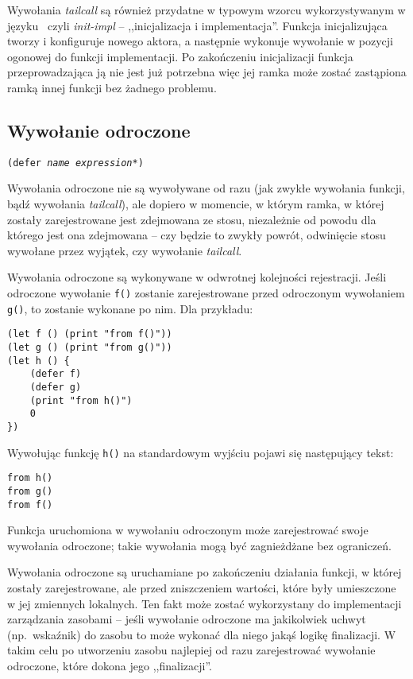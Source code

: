 Wywołania \emph{tailcall} są również przydatne w typowym wzorcu wykorzystywanym
w języku \ViuAct\ czyli \emph{init-impl} -- ,,inicjalizacja i implementacja''.
Funkcja inicjalizująca tworzy i konfiguruje nowego aktora, a następnie wykonuje
wywołanie w pozycji ogonowej do funkcji implementacji. Po zakończeniu
inicjalizacji funkcja przeprowadzająca ją nie jest już potrzebna więc jej ramka
może zostać zastąpiona ramką innej funkcji bez żadnego problemu.

\subsection{Wywołanie odroczone}
\label{viuact_spec_deferred_call}

\texttt{(defer \emph{name} \emph{expression}*)}
\newline

Wywołania odroczone nie są wywoływane od razu (jak zwykłe wywołania funkcji, bądź wywołania \emph{tailcall}),
ale dopiero w momencie, w którym ramka, w której zostały zarejestrowane jest zdejmowana ze stosu, niezależnie
od powodu dla którego jest ona zdejmowana -- czy będzie to zwykły powrót, odwinięcie stosu wywołane przez
wyjątek, czy wywołanie \emph{tailcall}.

Wywołania odroczone są wykonywane w odwrotnej kolejności rejestracji. Jeśli odroczone wywołanie \texttt{f()}
zostanie zarejestrowane przed odroczonym wywołaniem \texttt{g()}, to zostanie wykonane po nim. Dla przykładu:
\begin{lstlisting}
(let f () (print "from f()"))
(let g () (print "from g()"))
(let h () {
    (defer f)
    (defer g)
    (print "from h()")
    0
})
\end{lstlisting}

Wywołując funkcję \texttt{h()} na standardowym wyjściu pojawi się następujący tekst:
\begin{lstlisting}
from h()
from g()
from f()
\end{lstlisting}

Funkcja uruchomiona w wywołaniu odroczonym może zarejestrować swoje wywołania
odroczone; takie wywołania mogą być zagnieżdżane bez ograniczeń.

Wywołania odroczone są uruchamiane po zakończeniu działania funkcji, w której
zostały zarejestrowane, ale przed zniszczeniem wartości, które były umieszczone
w jej zmiennych lokalnych. Ten fakt może zostać wykorzystany do implementacji
zarządzania zasobami -- jeśli wywołanie odroczone ma jakikolwiek uchwyt
(np.~wskaźnik) do zasobu to może wykonać dla niego jakąś logikę finalizacji.
W takim celu po utworzeniu zasobu najlepiej od razu zarejestrować wywołanie
odroczone, które dokona jego ,,finalizacji''.

